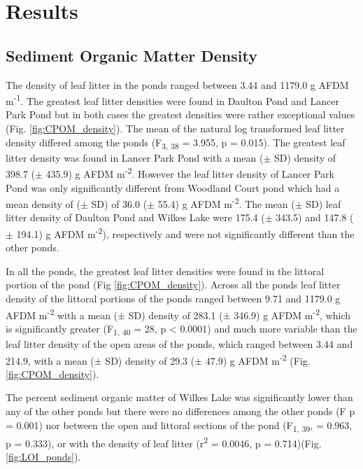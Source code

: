 \section{Results}
\subsection{Sediment Organic Matter Density}

The density of leaf litter in the ponds ranged between 3.44 and 1179.0 g AFDM m\textsuperscript{-1}. The greatest leaf litter densities were found in Daulton Pond and Lancer Park Pond but in both cases the greatest densities were rather exceptional values (Fig. \ref{fig:CPOM_density}). The mean of the natural log transformed leaf litter density differed among the ponds (F\textsubscript{3, 38} = 3.955, p = 0.015). The greatest leaf litter density was found in Lancer Park Pond with a mean ($\pm$ SD) density of 398.7 ($\pm$ 435.9) g AFDM m\textsuperscript{-2}. However the leaf litter density of Lancer Park Pond was only significantly different from Woodland Court pond which had a mean density of ($\pm$ SD) of 36.0 ($\pm$ 55.4) g AFDM m\textsuperscript{-2}. The mean ($\pm$ SD) leaf litter density of Daulton Pond and Wilkes Lake were 175.4 ($\pm$ 343.5) and 147.8 ($\pm$ 194.1) g AFDM m\textsuperscript{-2}), respectively and were not significantly different than the other ponds. 

In all the ponds, the greatest leaf litter densities were found in the littoral portion of the pond (Fig \ref{fig:CPOM_density}). Across all the ponds leaf litter density of the littoral portions of the ponds ranged between 9.71 and 1179.0 g AFDM m\textsuperscript{-2} with a mean ($\pm$ SD) density of 283.1 ($\pm$ 346.9) g AFDM m\textsuperscript{-2}, which is significantly greater (F\textsubscript{1, 40} = 28, p < 0.0001) and much more variable than the leaf litter density of the open areas of the ponds, which ranged between 3.44 and 214.9, with a mean ($\pm$ SD) density of 29.3 ($\pm$ 47.9) g AFDM m\textsuperscript{-2} (Fig. \ref{fig:CPOM_density}). 

The percent sediment organic matter of Wilkes Lake was significantly lower than any of the other ponds but there were no differences among the other ponds (F p = 0.001) nor between the open and littoral sections of the pond (F\textsubscript{1, 39}, = 0.963, p = 0.333), or with the density of leaf litter (r\textsuperscript{2} = 0.0046, p = 0.714)(Fig. \ref{fig:LOI_ponds}). 

  

  
